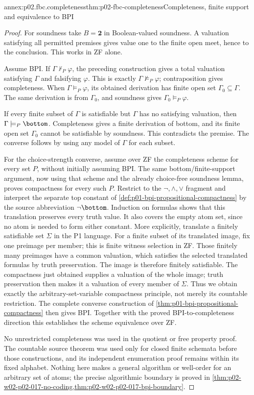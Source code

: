 \begin{annexitem}{annex:p02.fbc.completeness}{thm:p02-fbc-completeness}{Completeness, finite support and equivalence to BPI}
\begin{proof}
For soundness take \(B=\mathbf2\) in Boolean-valued soundness.
A valuation satisfying all permitted premises gives value one
to the finite open meet, hence to the conclusion.
This works in ZF alone.

Assume BPI. If \(\Gamma\not\vdash_P\varphi\), the preceding
construction gives a total valuation satisfying \(\Gamma\) and
falsifying \(\varphi\). This is exactly
\(\Gamma\not\models_P\varphi\); contraposition gives completeness.
When \(\Gamma\models_P\varphi\), its obtained derivation has
finite open set \(\Gamma_0\subseteq\Gamma\).
The same derivation is from \(\Gamma_0\), and soundness gives
\(\Gamma_0\models_P\varphi\).

If every finite subset of \(\Gamma\) is satisfiable but
\(\Gamma\) has no satisfying valuation, then
\(\Gamma\models_P\bottom\).
Completeness gives a finite derivation of bottom, and its finite
open set \(\Gamma_0\) cannot be satisfiable by soundness.
This contradicts the premise. The converse follows by using any
model of \(\Gamma\) for each subset.

For the choice-strength converse, assume over ZF the completeness
scheme for every set \(P\), without initially assuming BPI.
The same bottom/finite-support argument, now using that scheme
and the already choice-free soundness lemma, proves compactness
for every such \(P\).
Restrict to the \(\neg,\land,\lor\) fragment and interpret the
separate top constant of
\cref{def:p01-bpi-propositional-compactness} by the source
abbreviation \(\neg\bottom\).
Induction on formulas shows that this translation preserves every
truth value. It also covers the empty atom set, since no atom
is needed to form either constant.
More explicitly, translate a finitely satisfiable set \(\Sigma\)
in the P1 language. For a finite subset of its translated image,
fix one preimage per member; this is finite witness selection in ZF.
Those finitely many preimages have a common valuation, which satisfies
the selected translated formulas by truth preservation.
The image is therefore finitely satisfiable. The compactness just
obtained supplies a valuation of the whole image; truth preservation
then makes it a valuation of every member of \(\Sigma\).
Thus we obtain exactly the arbitrary-set-variable compactness
principle, not merely its countable restriction.
The complete converse construction of
\cref{thm:p01-bpi-propositional-compactness} then gives BPI.
Together with the proved BPI-to-completeness direction this
establishes the scheme equivalence over ZF.

No unrestricted completeness was used in the quotient or free
property proof. The countable source theorem was used only for
closed finite schemata before those constructions, and its
independent enumeration proof remains within its fixed alphabet.
Nothing here makes a general algorithm or well-order for an
arbitrary set of atoms; the precise algorithmic boundary is proved in
\cref{thm:p02-w02-p02-017-no-coding,thm:p02-w02-p02-017-bpi-boundary}.
\end{proof}
\end{annexitem}
